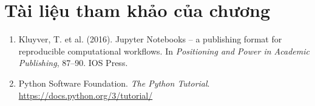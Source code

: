 \section*{Tài liệu tham khảo của chương}
\begin{enumerate}
    \item Kluyver, T. et al. (2016). Jupyter Notebooks -- a publishing format for reproducible computational workflows. In \textit{Positioning and Power in Academic Publishing}, 87--90. IOS Press.
    \item Python Software Foundation. \textit{The Python Tutorial}. \url{https://docs.python.org/3/tutorial/}
\end{enumerate}